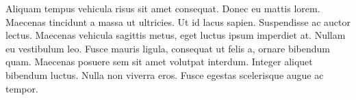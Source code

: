 Aliquam tempus vehicula risus sit amet consequat. Donec eu mattis lorem. Maecenas tincidunt a massa ut ultricies. Ut id lacus sapien. Suspendisse ac auctor lectus. Maecenas vehicula sagittis metus, eget luctus ipsum imperdiet at. Nullam eu vestibulum leo. Fusce mauris ligula, consequat ut felis a, ornare bibendum quam. Maecenas posuere sem sit amet volutpat interdum. Integer aliquet bibendum luctus. Nulla non viverra eros. Fusce egestas scelerisque augue ac tempor.